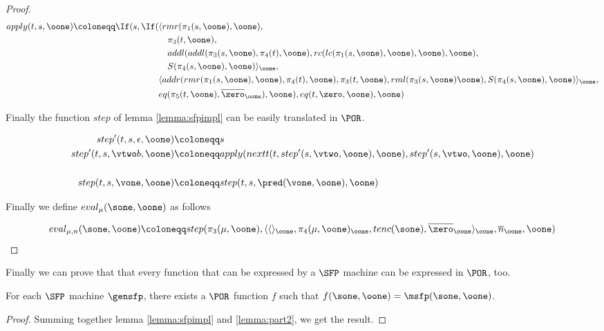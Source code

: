 \begin{proof}
\begin{align*}
apply(t, s, \oone)\coloneqq \If(s, \If(&\langle rmr(\pi_1(s, \oone), \oone),\\
                                &\quad \pi_3 (t, \oone),\\
                                &\quad addl(addl(\pi_3(s, \oone), \pi_4(t), \oone), rc(lc(\pi_1(s, \oone), \oone), \oone), \oone),\\
                                &\quad S(\pi_4(s, \oone), \oone)\rangle_\oone, \\
                                &\langle addr(rmr(\pi_1(s, \oone), \oone), \pi_4(t), \oone), \pi_3 (t, \oone), rml(\pi_3(s, \oone)\oone), S(\pi_4(s, \oone), \oone)\rangle_\oone, \\
                                &eq(\pi_5(t, \oone), \overline \zero_\oone), \oone), eq(t, \zero, \oone), \oone)
\end{align*}

Finally the function $step$ of lemma \ref{lemma:sfpimpl} can be easily translated in $\POR$.

\begin{align*}
step'(t, s, \epsilon, \oone)&\coloneqq s\\
step'(t, s,\vtwo b, \oone)&\coloneqq apply(nextt(t, step'(s, \vtwo, \oone), \oone), step'(s, \vtwo, \oone), \oone)\\\\
step(t, s,\vone, \oone)&\coloneqq step(t, s, \pred(\vone, \oone), \oone)
\end{align*}

Finally we define $eval_\mu(\sone, \oone)$ as follows

\[
eval_{\mu, n}(\sone, \oone)\coloneqq step(\pi_3(\mu, \oone), \langle \langle\rangle_\oone, \pi_4(\mu, \oone)_\oone, tenc(\sone),\overline \zero_\oone \rangle_\oone, \overline n_\oone, \oone)
\]
\end{proof}

Finally we can prove that that every function that can be expressed by a $\SFP$ machine can be expressed in $\POR$, too.

\begin{prop}
For each $\SFP$ machine $\gensfp$, there exists a $\POR$ function $f$ such that $f(\sone, \oone)=\msfp(\sone, \oone)$.
\label{prop:sfpsubseteqor}
\end{prop}
\begin{proof}
Summing together lemma \ref{lemma:sfpimpl} and \ref{lemma:part2}, we get the result.
\end{proof}

